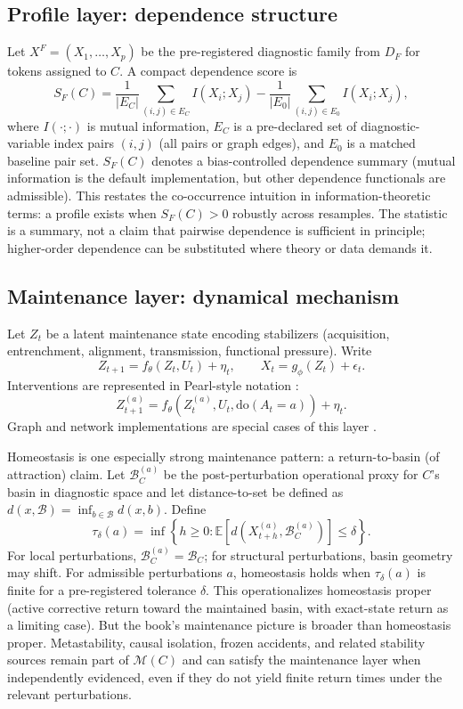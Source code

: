 \subsection*{Profile layer: dependence structure}

Let $X^F=(X_1,\dots,X_p)$ be the pre-registered diagnostic family from $D_F$ for tokens assigned to $C$. A compact dependence score is
\[
S_F(C)=\frac{1}{|E_C|}\sum_{(i,j)\in E_C} I(X_i;X_j)
      -\frac{1}{|E_0|}\sum_{(i,j)\in E_0} I(X_i;X_j),
\]
where $I(\cdot;\cdot)$ is mutual information, $E_C$ is a pre-declared set of diagnostic-variable index pairs $(i,j)$ (all pairs or graph edges), and $E_0$ is a matched baseline pair set. $S_F(C)$ denotes a bias-controlled dependence summary (mutual information is the default implementation, but other dependence functionals are admissible). This restates the co-occurrence intuition in information-theoretic terms: a profile exists when $S_F(C)>0$ robustly across resamples. The statistic is a summary, not a claim that pairwise dependence is sufficient in principle; higher-order dependence can be substituted where theory or data demands it.

\subsection*{Maintenance layer: dynamical mechanism}

Let $Z_t$ be a latent maintenance state encoding stabilizers (acquisition, entrenchment, alignment, transmission, functional pressure). Write
\[
Z_{t+1}=f_{\theta}(Z_t,U_t)+\eta_t,\qquad X_t=g_{\phi}(Z_t)+\epsilon_t .
\]
Interventions are represented in Pearl-style notation \parencite{pearl2009}:
\[
Z_{t+1}^{(a)}=f_{\theta}\!\left(Z_t^{(a)},U_t,\mathrm{do}(A_t=a)\right)+\eta_t .
\]
Graph and network implementations are special cases of this layer \parencite{khalidi2015three,borsboom2017}.

Homeostasis is one especially strong maintenance pattern: a return-to-basin (of attraction) claim. Let $\mathcal{B}_C^{(a)}$ be the post-perturbation operational proxy for $C$'s basin in diagnostic space and let distance-to-set be defined as $d(x,\mathcal{B})=\inf_{b\in\mathcal{B}} d(x,b)$. Define
\[
\tau_{\delta}(a)=\inf\left\{h\geq 0 : \mathbb{E}\!\left[d\!\left(X_{t+h}^{(a)},\mathcal{B}_C^{(a)}\right)\right]\leq \delta\right\}.
\]
For local perturbations, $\mathcal{B}_C^{(a)}=\mathcal{B}_C$; for structural perturbations, basin geometry may shift. For admissible perturbations $a$, homeostasis holds when $\tau_{\delta}(a)$ is finite for a pre-registered tolerance $\delta$. This operationalizes homeostasis proper (active corrective return toward the maintained basin, with exact-state return as a limiting case). But the book's maintenance picture is broader than homeostasis proper. Metastability, causal isolation, frozen accidents, and related stability sources remain part of $\mathcal{M}(C)$ and can satisfy the maintenance layer when independently evidenced, even if they do not yield finite return times under the relevant perturbations.


